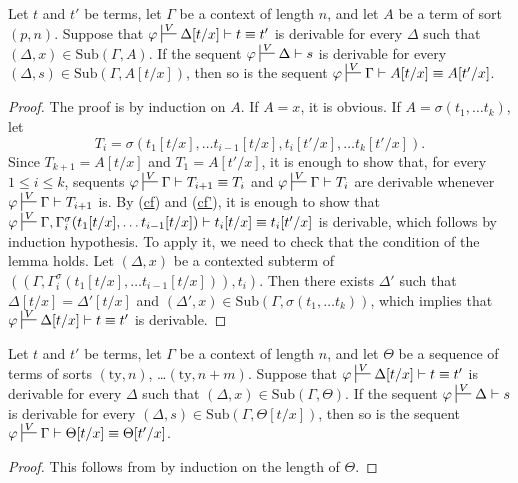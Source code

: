 \documentclass[reqno]{amsart}
\newcommand{\axref}[1]{(\hyperref[ax:#1]{#1})}
\theoremstyle{definition}
\theoremstyle{remark}
\newcommand{\fs}[1]{\mathrm{#1}}
\newcommand{\ty}{\fs{ty}}
\newcommand{\sub}{\fs{Sub}}
\numberwithin{figure}{section}
\begin{document}
\begin{lem}
Let $t$ and $t'$ be terms, let $\Gamma$ be a context of length $n$, and let $A$ be a term of sort $(p,n)$.
Suppose that $\varphi \sststile{}{V} \Delta[t/x] \vdash t \equiv t'$ is derivable for every $\Delta$ such that $(\Delta,x) \in \sub(\Gamma,A)$.
If the sequent $\varphi \sststile{}{V} \Delta \vdash s$ is derivable for every $(\Delta,s) \in \sub(\Gamma,A[t/x])$, then so is the sequent $\varphi \sststile{}{V} \Gamma \vdash A[t/x] \equiv A[t'/x]$.
\end{lem}
\begin{proof}
The proof is by induction on $A$.
If $A = x$, it is obvious.
If $A = \sigma(t_1, \ldots t_k)$, let
\[ T_i = \sigma(t_1[t/x], \ldots t_{i-1}[t/x], t_i[t'/x], \ldots t_k[t'/x]). \]
Since $T_{k+1} = A[t/x]$ and $T_1 = A[t'/x]$, it is enough to show that, for every $1 \leq i \leq k$, sequents $\varphi \sststile{}{V} \Gamma \vdash T_{i+1} \equiv T_i$ and $\varphi \sststile{}{V} \Gamma \vdash T_i$ are derivable whenever $\varphi \sststile{}{V} \Gamma \vdash T_{i+1}$ is.
By \axref{cf} and \axref{cf'}, it is enough to show that $\varphi \sststile{}{V} \Gamma, \Gamma^\sigma_i(t_1[t/x], \ldots t_{i-1}[t/x]) \vdash t_i[t/x] \equiv t_i[t'/x]$ is derivable, which follows by induction hypothesis.
To apply it, we need to check that the condition of the lemma holds.
Let $(\Delta,x)$ be a contexted subterm of $((\Gamma, \Gamma^\sigma_i(t_1[t/x], \ldots t_{i-1}[t/x])), t_i)$.
Then there exists $\Delta'$ such that $\Delta[t/x] = \Delta'[t/x]$ and $(\Delta',x) \in \sub(\Gamma, \sigma(t_1, \ldots t_k))$, which implies that $\varphi \sststile{}{V} \Delta[t/x] \vdash t \equiv t'$ is derivable.
\end{proof}

\begin{lem}
Let $t$ and $t'$ be terms, let $\Gamma$ be a context of length $n$, and let $\Theta$ be a sequence of terms of sorts $(\ty,n)$, \ldots $(\ty,n+m)$.
Suppose that $\varphi \sststile{}{V} \Delta[t/x] \vdash t \equiv t'$ is derivable for every $\Delta$ such that $(\Delta,x) \in \sub(\Gamma,\Theta)$.
If the sequent $\varphi \sststile{}{V} \Delta \vdash s$ is derivable for every $(\Delta,s) \in \sub(\Gamma,\Theta[t/x])$, then so is the sequent $\varphi \sststile{}{V} \Gamma \vdash \Theta[t/x] \equiv \Theta[t'/x]$.
\end{lem}
\begin{proof}
This follows from  by induction on the length of $\Theta$.
\end{proof}
\end{document}
